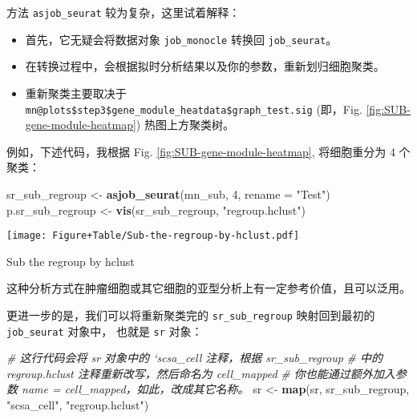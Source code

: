 \documentclass[
]{article}
\newenvironment{Shaded}{\begin{snugshade}}{\end{snugshade}}
\newcommand{\CommentTok}[1]{\textcolor[rgb]{0.56,0.35,0.01}{\textit{#1}}}
\newcommand{\DataTypeTok}[1]{\textcolor[rgb]{0.13,0.29,0.53}{#1}}
\newcommand{\DecValTok}[1]{\textcolor[rgb]{0.00,0.00,0.81}{#1}}
\newcommand{\KeywordTok}[1]{\textcolor[rgb]{0.13,0.29,0.53}{\textbf{#1}}}
\newcommand{\NormalTok}[1]{#1}
\newcommand{\StringTok}[1]{\textcolor[rgb]{0.31,0.60,0.02}{#1}}
\providecommand{\tightlist}{%
  \setlength{\itemsep}{0pt}\setlength{\parskip}{0pt}}
\begin{document}
方法 \texttt{asjob\_seurat} 较为复杂，这里试着解释：

\begin{itemize}
\tightlist
\item
  首先，它无疑会将数据对象 \texttt{job\_monocle} 转换回 \texttt{job\_seurat}。
\item
  在转换过程中，会根据拟时分析结果以及你的参数，重新划归细胞聚类。
\item
  重新聚类主要取决于 \texttt{mn@plots\$step3\$gene\_module\_heatdata\$graph\_test.sig}
  (即，Fig. \ref{fig:SUB-gene-module-heatmap}) 热图上方聚类树。
\end{itemize}

例如，下述代码，我根据 Fig. \ref{fig:SUB-gene-module-heatmap}, 将细胞重分为 4 个聚类：

\begin{Shaded}
\begin{Highlighting}[]
\NormalTok{sr\_sub\_regroup \textless{}{-}}\StringTok{ }\KeywordTok{asjob\_seurat}\NormalTok{(mn\_sub, }\DecValTok{4}\NormalTok{, }\DataTypeTok{rename =} \StringTok{"Test"}\NormalTok{)}
\NormalTok{p.sr\_sub\_regroup \textless{}{-}}\StringTok{ }\KeywordTok{vis}\NormalTok{(sr\_sub\_regroup, }\StringTok{"regroup.hclust"}\NormalTok{)}
\end{Highlighting}
\end{Shaded}

\def\@captype{figure}
\begin{center}
\texttt{[image: Figure+Table/Sub-the-regroup-by-hclust.pdf]}
\caption{Sub the regroup by hclust}\label{fig:Sub-the-regroup-by-hclust}
\end{center}

这种分析方式在肿瘤细胞或其它细胞的亚型分析上有一定参考价值，且可以泛用。

更进一步的是，我们可以将重新聚类完的 \texttt{sr\_sub\_regroup} 映射回到最初的 \texttt{job\_seurat} 对象中，
也就是 \texttt{sr} 对象：

\begin{Shaded}
\begin{Highlighting}[]
\CommentTok{\# 这行代码会将 \textasciigrave{}sr\textasciigrave{} 对象中的 ‘scsa\_cell\textasciigrave{} 注释，根据 \textasciigrave{}sr\_sub\_regroup\textasciigrave{}}
\CommentTok{\# 中的 \textquotesingle{}regroup.hclust\textquotesingle{} 注释重新改写，然后命名为 \textquotesingle{}cell\_mapped\textquotesingle{}}
\CommentTok{\# 你也能通过额外加入参数 \textasciigrave{}name = \textquotesingle{}cell\_mapped\textquotesingle{}\textasciigrave{}，如此，改成其它名称。}
\NormalTok{sr \textless{}{-}}\StringTok{ }\KeywordTok{map}\NormalTok{(sr, sr\_sub\_regroup, }\StringTok{"scsa\_cell"}\NormalTok{, }\StringTok{"regroup.hclust"}\NormalTok{)}
\end{Highlighting}
\end{Shaded}
\end{document}
